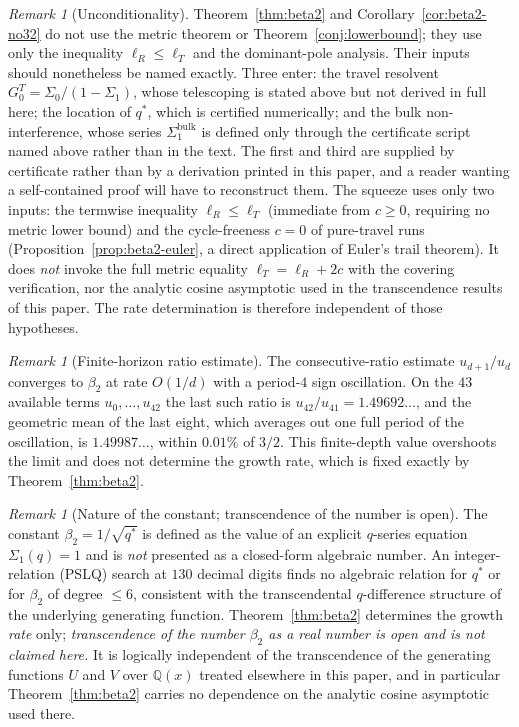 \documentclass[11pt]{article}
\theoremstyle{plain}
\theoremstyle{definition}
\theoremstyle{remark}
\newtheorem{remark}[theorem]{Remark}
\begin{document}
\begin{remark}[Unconditionality]
\label{rem:beta2-unconditional}
Theorem~\ref{thm:beta2} and Corollary~\ref{cor:beta2-no32} do not use the metric
theorem or Theorem~\ref{conj:lowerbound}; they use only the inequality
$\ell_R\le\ell_T$ and the dominant-pole analysis. Their inputs should
nonetheless be named exactly. Three enter: the travel resolvent
$G^T_0=\Sigma_0/(1-\Sigma_1)$, whose telescoping is stated above but not derived
in full here; the location of $q^\ast$, which is certified numerically; and the
bulk non-interference, whose series $\Sigma_1^{\mathrm{bulk}}$ is defined only
through the certificate script named above rather than in the text. The first
and third are supplied by certificate rather than by a derivation printed in
this paper, and a reader wanting a self-contained proof will have to
reconstruct them.
The squeeze uses only two inputs: the termwise inequality $\ell_R\le\ell_T$
(immediate from $c\ge0$, requiring no metric lower bound) and the cycle-freeness
$c=0$ of pure-travel runs (Proposition~\ref{prop:beta2-euler}, a direct
application of Euler's trail theorem). It does \emph{not} invoke the full metric
equality $\ell_T=\ell_R+2c$ with the covering verification, nor the analytic
cosine asymptotic used in the transcendence results of this paper. The rate
determination is therefore independent of those hypotheses.
\end{remark}

\begin{remark}[Finite-horizon ratio estimate]
\label{rem:beta2-overshoot}
The consecutive-ratio estimate $u_{d+1}/u_d$ converges to $\beta_2$ at rate
$O(1/d)$ with a period-$4$ sign oscillation. On the $43$ available terms
$u_0,\dots,u_{42}$ the last such ratio is $u_{42}/u_{41}=1.49692\ldots$, and
the geometric mean of the last eight, which averages out one full period of
the oscillation, is $1.49987\ldots$, within $0.01\%$ of $3/2$. This
finite-depth value overshoots
the limit and does not determine the growth rate, which is fixed exactly by
Theorem~\ref{thm:beta2}.
\end{remark}

\begin{remark}[Nature of the constant; transcendence of the number is open]
\label{rem:beta2-nature}
The constant $\beta_2=1/\sqrt{q^\ast}$ is defined as the value of an explicit
$q$-series equation $\Sigma_1(q)=1$ and is \emph{not} presented as a
closed-form algebraic number. An integer-relation (PSLQ) search at $130$
decimal digits finds no algebraic relation for $q^\ast$ or for
$\beta_2$ of degree $\le 6$, consistent with the transcendental $q$-difference
structure of the underlying generating function. Theorem~\ref{thm:beta2}
determines the growth \emph{rate} only;
\emph{transcendence of the number $\beta_2$ as a real number is open and is not
claimed here.} It is logically independent of the transcendence of the
generating functions $U$ and $V$ over $\mathbb Q(x)$ treated elsewhere in this
paper, and in particular Theorem~\ref{thm:beta2} carries no dependence on the
analytic cosine asymptotic used there.
\end{remark}
\end{document}
